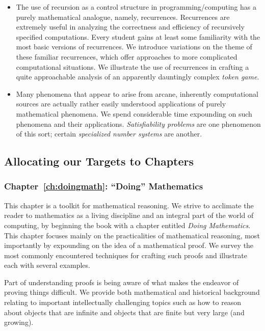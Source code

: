 \begin{enumerate}
\begin{itemize}
\medskip\item
The use of recursion as a control structure in programming/computing has a purely mathematical analogue, namely, recurrences.  Recurrences are extremely useful in analyzing the correctness and efficiency of recursively specified computations.  Every student gains at least some familiarity with the most basic versions of recurrences.  We introduce variations on the theme of these familiar recurrences, which offer approaches to more complicated computational situations.  We illustrate the use of recurrences in crafting a quite approachable analysis of an apparently dauntingly complex {\em token game}.
\medskip\item
Many phenomena that appear to arise from arcane, inherently computational sources are actually rather easily understood applications of purely mathematical phenomena.  We spend considerable time expounding on such phenomena and their applications.   {\em Satisfiability problems} are one phenomenon of this sort; certain {\em specialized number systems} are another.
\end{itemize}
\end{enumerate}


\subsection{Allocating our Targets to Chapters}
\label{sec:the chapters}

\subsubsection{Chapter~\ref{ch:doingmath}: ``Doing'' Mathematics}

This chapter is a toolkit for mathematical reasoning.  We strive to acclimate the reader to mathematics as a living discipline and an integral part of the world of computing, by beginning the book with a chapter entitled {\it Doing Mathematics}.  This chapter focuses mainly on the practicalities of mathematical reasoning, most importantly by expounding on the idea of a mathematical proof.  We survey the most commonly encountered techniques for crafting such
proofs and illustrate each with several examples.

\smallskip

Part of understanding proofs is being aware of what makes the endeavor of proving things difficult.  We provide both mathematical and historical background relating to important intellectually challenging topics such as how to reason about objects that are infinite and objects that are finite but very large (and growing).

